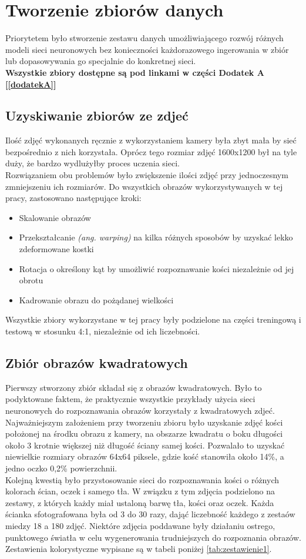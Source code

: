 
\chapter{Tworzenie zbiorów danych}
Priorytetem było stworzenie zestawu danych
umożliwiającego rozwój różnych modeli sieci neuronowych bez konieczności każdorazowego
ingerowania w zbiór lub dopasowywania go specjalnie do konkretnej sieci.\\
\textbf{Wszystkie zbiory dostępne są pod linkami w części Dodatek A [\ref{dodatekA}] }

\section{Uzyskiwanie zbiorów ze zdjeć}
Ilość zdjęć wykonanych ręcznie z wykorzystaniem kamery była zbyt mała by sieć bezpośrednio
z nich korzystała. Oprócz tego rozmiar zdjęć 1600x1200 był na tyle duży, że bardzo wydlużyłby
proces uczenia sieci.\\
Rozwiązaniem obu problemów było zwiększenie ilości zdjęć przy jednoczesnym zmniejszeniu
ich rozmiarów. Do wszystkich obrazów wykorzystywanych w tej pracy, zastosowano następujące
kroki:
\begin{itemize}
\item Skalowanie obrazów
\item Przekształcanie \textit{(ang. warping)} na kilka różnych sposobów by uzyskać lekko zdeformowane kostki
\item Rotacja o określony kąt by umożliwić rozpoznawanie kości niezależnie od jej obrotu
\item Kadrowanie obrazu do pożądanej wielkości
\end{itemize}
Wszystkie zbiory wykorzystane w tej pracy były podzielone na części treningową i testową
w stosunku 4:1, niezależnie od ich liczebności.

\section{Zbiór obrazów kwadratowych}
Pierwszy stworzony zbiór składał się z obrazów kwadratowych. Było to podyktowane
faktem, że praktycznie wszystkie przykłady użycia sieci neuronowych do rozpoznawania
obrazów korzystały z kwadratowych zdjeć.\\
Najważniejszym założeniem przy tworzeniu zbioru było uzyskanie zdjęć kości położonej
na środku obrazu z kamery, na obszarze kwadratu o boku długości około 3 krotnie większej
niż długość ściany samej kości. Pozwalało to uzyskać niewielkie rozmiary obrazów 64x64 piksele,
gdzie kość stanowiła około 14\%, a jedno oczko 0,2\% powierzchnii.\\
Kolejną kwestią było przystosowanie sieci do rozpoznawania kości o różnych kolorach ścian,
oczek i samego tła. W związku z tym zdjęcia podzielono na zestawy, z których każdy miał ustaloną
barwę tła, kości oraz oczek. Każda ścianka sfotografowana była od 3 do 30 razy, dająć
liczebność każdego z zestaów miedzy 18 a 180 zdjęć. Niektóre zdjęcia poddawane były
działaniu ostrego, punktowego światła w celu wygenerowania trudniejszych do rozpoznania obrazów.
Zestawienia kolorystyczne wypisane są w tabeli poniżej \ref{tab:zestawienie1}.

